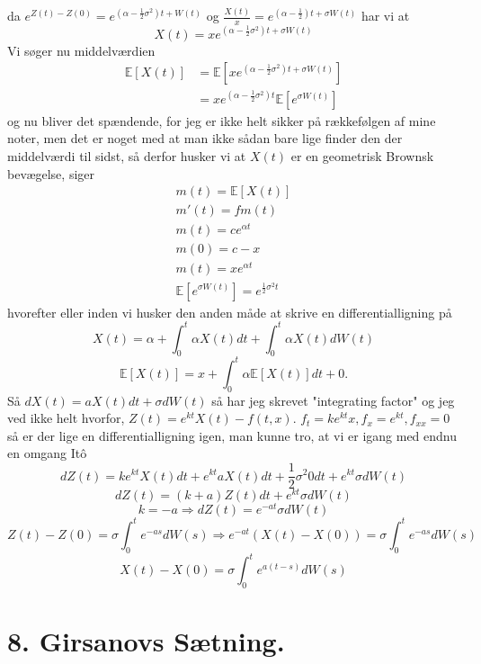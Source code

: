 \documentclass[12pt]{report}
\theoremstyle{break}
\theoremstyle{break}
\newcommand{\EE}{\mathbb{E}}
\newcommand{\1}{\mathds{1}}
\begin{document}
da $e^{Z(t)-Z(0)}=e^{\left(\alpha - \frac{1}{2}\sigma^2\right)t+W(t)}$ og $\frac{X(t)}{x}=e^{\left(\alpha-\frac{1}{2}\right)t+\sigma W(t)}$ har vi at 
\[ X(t)=xe^{\left(\alpha-\frac{1}{2}\sigma^2\right)t+\sigma W(t)} \]
Vi søger nu middelværdien
\begin{align*}
	\EE\left[X(t)\right]&=\EE\left[ xe^{\left(\alpha-\frac{1}{2}\sigma^2\right)t+\sigma W(t)} \right]\\
	&=xe^{\left(\alpha-\frac{1}{2}\sigma^2\right)t}\EE\left[ e^{\sigma W(t)} \right]
\end{align*}
og nu bliver det spændende, for jeg er ikke helt sikker på rækkefølgen af mine noter, men det er noget med at man ikke sådan bare lige finder den der middelværdi til sidst, så derfor husker vi at $X(t)$ er en geometrisk Brownsk bevægelse, siger
\begin{align*}
	m(t)=\EE[X(t)]\\
	m'(t)=fm(t)\\
	m(t)=ce^{\alpha t}\\
	m(0)=c-x\\
	m(t)=xe^{\alpha t}\\
	\EE\left[ e^{\sigma W(t)} \right]=e^{\frac{1}{2}\sigma^2 t}
\end{align*}
hvorefter eller inden vi husker den anden måde at skrive en differentialligning på
\[ X(t)=\alpha +\int_{0}^{t}\alpha X(t) dt+ \int_{0}^{t}\alpha  X(t)dW(t)\]
\[ \EE\left[ X(t) \right]=x+\int_{0}^{t}\alpha\EE\left[ X(t) \right]dt+0. \]
Så $dX(t)=aX(t)dt+\sigma dW(t)$ så har jeg skrevet "integrating factor" og jeg ved ikke helt hvorfor, $Z(t)=e^{kt}X(t)-f(t,x)$. $f_t=ke^{kt}x, f_x=e^{kt},f_{xx}=0$ så er der lige en differentialligning igen, man kunne tro, at vi er igang med endnu en omgang Itô
\[ dZ(t)=ke^{kt}X(t)dt+e^{kt}aX(t)dt+\frac{1}{2}\sigma^2 0dt+e^{kt}\sigma dW(t) \]
\[ dZ(t)=(k+a)Z(t)dt+e^{kt}\sigma dW(t) \]
\[ k=-a\Rightarrow dZ(t)=e^{-at}\sigma dW(t) \]
\[ Z(t)-Z(0)=\sigma\int_{0}^{t}e^{-as}dW(s)\Rightarrow e^{-at}(X(t)-X(0)) = \sigma\int_{0}^{t}e^{-as}dW(s) \]
\[ X(t)-X(0)=\sigma\int_{0}^{t}e^{a(t-s)}dW(s) \]

\newpage

\section*{8. Girsanovs Sætning.}
\end{document}
